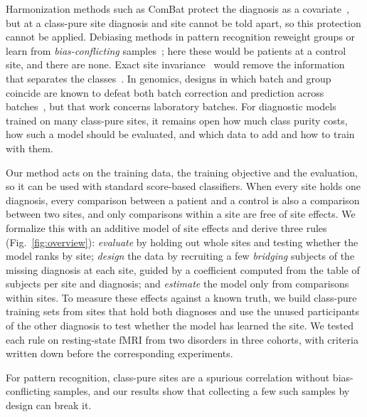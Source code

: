 Harmonization methods such as ComBat protect the diagnosis as a covariate~\cite{johnson2007,fortin2018}, but at a class-pure site diagnosis and site cannot be told apart, so this protection cannot be applied. Debiasing methods in pattern recognition reweight groups or learn from \emph{bias-conflicting} samples~\cite{sagawa2020,zhang2022cnc,wang2025mdn}; here these would be patients at a control site, and there are none. Exact site invariance~\cite{ganin2016,dinsdale2021,kunda2023} would remove the information that separates the classes~\cite{zhao2019}. In genomics, designs in which batch and group coincide are known to defeat both batch correction and prediction across batches~\cite{song2020,parker2012}, but that work concerns laboratory batches. For diagnostic models trained on many class-pure sites, it remains open how much class purity costs, how such a model should be evaluated, and which data to add and how to train with them.

Our method acts on the training data, the training objective and the evaluation, so it can be used with standard score-based classifiers. When every site holds one diagnosis, every comparison between a patient and a control is also a comparison between two sites, and only comparisons within a site are free of site effects. We formalize this with an additive model of site effects and derive three rules (Fig.~\ref{fig:overview}): \emph{evaluate} by holding out whole sites and testing whether the model ranks by site; \emph{design} the data by recruiting a few \emph{bridging} subjects of the missing diagnosis at each site, guided by a coefficient computed from the table of subjects per site and diagnosis; and \emph{estimate} the model only from comparisons within sites. To measure these effects against a known truth, we build class-pure training sets from sites that hold both diagnoses and use the unused participants of the other diagnosis to test whether the model has learned the site. We tested each rule on resting-state fMRI from two disorders in three cohorts, with criteria written down before the corresponding experiments.

For pattern recognition, class-pure sites are a spurious correlation without bias-conflicting samples, and our results show that collecting a few such samples by design can break it.

